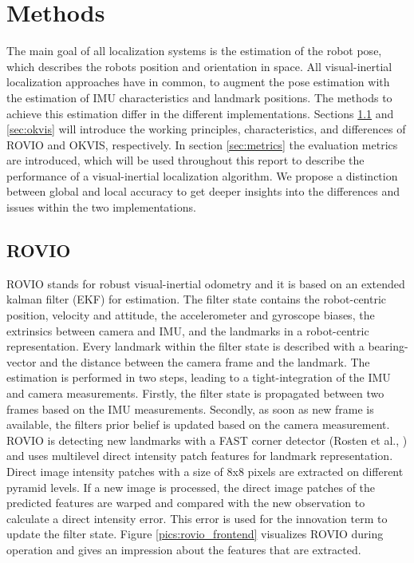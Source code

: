 \chapter{Methods}
\label{sec:methods}

The main goal of all localization systems is the estimation of the robot pose, which describes the robots position and orientation in space. All visual-inertial localization approaches have in common, to augment the pose estimation with the estimation of IMU characteristics and landmark positions. The methods to achieve this estimation differ in the different implementations. Sections \ref{sec:rovio} and \ref{sec:okvis} will introduce the working principles, characteristics, and differences of ROVIO and OKVIS, respectively. In section \ref{sec:metrics} the evaluation metrics are introduced, which will be used throughout this report to describe the performance of a visual-inertial localization algorithm. We propose a distinction between global and local accuracy to get deeper insights into the differences and issues within the two implementations. 

\section{ROVIO}
\label{sec:rovio}

ROVIO stands for robust visual-inertial odometry and it is based on an extended kalman filter (EKF) for estimation. The filter state contains the robot-centric position, velocity and attitude, the accelerometer and gyroscope biases, the extrinsics between camera and IMU, and the landmarks in a robot-centric representation. Every landmark within the filter state is described with a bearing-vector and the distance between the camera frame and the landmark. The estimation is performed in two steps, leading to a tight-integration of the IMU and camera measurements. Firstly, the filter state is propagated between two frames based on the IMU measurements. Secondly, as soon as new frame is available, the filters prior belief is updated based on the camera measurement. ROVIO is detecting new landmarks with a FAST corner detector (Rosten et al., \cite{rosten2006machine}) and uses multilevel direct intensity patch features for landmark representation. Direct image intensity patches with a size of 8x8 pixels are extracted on different pyramid levels. If a new image is processed, the direct image patches of the predicted features are warped and compared with the new observation to calculate a direct intensity error. This error is used for the innovation term to update the filter state. Figure \ref{pics:rovio_frontend} visualizes ROVIO during operation and gives an impression about the features that are extracted.

